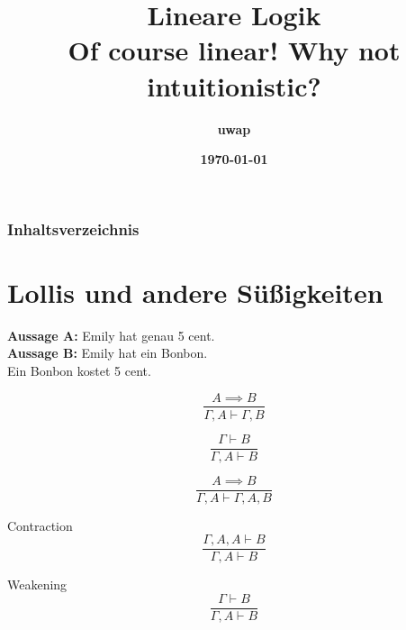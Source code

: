 \documentclass{beamer}
\title{\textbf{Lineare Logik} \\ Of course linear! Why not intuitionistic?}
\author{\textbf{uwap}}
\date{\textbf{\today}}
\begin{document}
\begin{frame}
  \titlepage%
\end{frame}

\begin{frame}
  \frametitle{Inhaltsverzeichnis}
  \tableofcontents
\end{frame}

\section{Lollis und andere Süßigkeiten}
\begin{frame}
  \textbf{Aussage A:} Emily hat genau 5 cent.\\ \pause%
  \textbf{Aussage B:} Emily hat ein Bonbon.\\ \pause%
  Ein Bonbon kostet 5 cent.\\ \pause%

  \begin{equation}
    \frac{A \implies B}
         {\Gamma, A \vdash \Gamma, B}
  \end{equation}
  
  \pause%
  
  \begin{equation}
    \frac{\Gamma \vdash B}
         {\Gamma, A \vdash B}
  \end{equation}
  
  \pause%
  
  \begin{equation}
    \frac{A \implies B}
         {\Gamma, A \vdash \Gamma, A, B}
  \end{equation}
\end{frame}

\begin{frame}
  Contraction
  \begin{equation*}
    \frac{\Gamma, A, A \vdash B}
         {\Gamma, A \vdash B}
  \end{equation*}

  Weakening
  \begin{equation*}
    \frac{\Gamma \vdash B}
         {\Gamma, A \vdash B}
  \end{equation*}
\end{frame}
\end{document}
